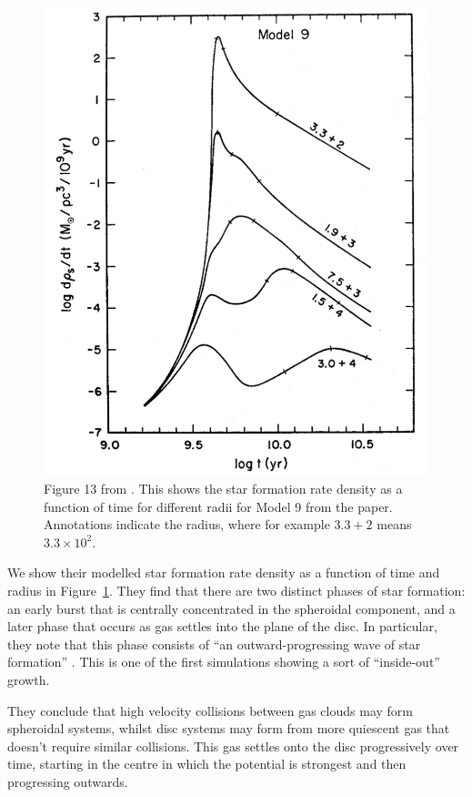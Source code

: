 \documentclass[preprint2]{aastex631}
\begin{document}
\begin{figure}[htb]
    \centering
    \includegraphics[width=\columnwidth]{larson1976_fig13.png}
    \caption{Figure 13 from \citet{Larson+1976}. This shows the star formation rate density as a function of time for different radii for Model 9 from the paper. Annotations indicate the radius, where for example $3.3+2$ means $3.3 \times 10^2$.}
    \label{fig:larson76}
\end{figure}

We show their modelled star formation rate density as a function of time and radius in Figure~\ref{fig:larson76}. They find that there are two distinct phases of star formation: an early burst that is centrally concentrated in the spheroidal component, and a later phase that occurs as gas settles into the plane of the disc. In particular, they note that this phase consists of ``an outward-progressing wave of star formation'' \citep{Larson+1976}. This is one of the first simulations showing a sort of ``inside-out'' growth.

They conclude that high velocity collisions between gas clouds may form spheroidal systems, whilst disc systems may form from more quiescent gas that doesn't require similar collisions. This gas settles onto the disc progressively over time, starting in the centre in which the potential is strongest and then progressing outwards.
\end{document}

